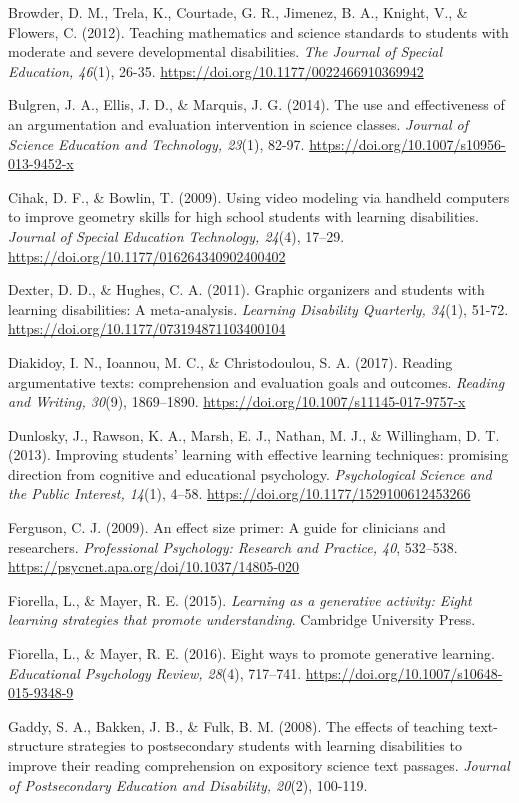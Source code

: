 \documentclass[11.5pt]{sig-alternate} %
\begin{document}
Browder, D. M., Trela, K., Courtade, G. R., Jimenez, B. A., Knight, V., \& Flowers, C. (2012). Teaching mathematics and science standards to students with moderate and severe developmental disabilities. \textit{The Journal of Special Education, 46}(1), 26-35. \url{https://doi.org/10.1177/0022466910369942}

Bulgren, J. A., Ellis, J. D., \& Marquis, J. G. (2014). The use and effectiveness of an argumentation and evaluation intervention in science classes. \textit{Journal of Science Education and Technology, 23}(1), 82-97. \url{https://doi.org/10.1007/s10956-013-9452-x}

 Cihak, D. F., \& Bowlin, T. (2009). Using video modeling via handheld computers to improve geometry skills for high school students with learning disabilities. \textit{Journal of Special Education Technology, 24}(4), 17–29. \url{https://doi.org/10.1177/016264340902400402}
 
Dexter, D. D., \& Hughes, C. A. (2011). Graphic organizers and students with learning disabilities: A meta-analysis. \textit{Learning Disability Quarterly, 34}(1), 51-72. \url{https://doi.org/10.1177/073194871103400104}

Diakidoy, I. N., Ioannou, M. C., \& Christodoulou, S. A. (2017). Reading argumentative texts: comprehension and evaluation goals and outcomes. \textit{Reading and Writing, 30}(9), 1869–1890. \url{https://doi.org/10.1007/s11145-017-9757-x}

Dunlosky, J., Rawson, K. A., Marsh, E. J., Nathan, M. J., \& Willingham, D. T. (2013). Improving students’ learning with effective learning techniques: promising direction from cognitive and educational psychology. \textit{Psychological Science and the Public Interest, 14}(1), 4–58. \url{https://doi.org/10.1177/1529100612453266}

Ferguson, C. J. (2009). An effect size primer: A guide for clinicians and researchers. \textit{Professional Psychology: Research and Practice, 40}, 532–538. \url{https://psycnet.apa.org/doi/10.1037/14805-020}

Fiorella, L., \& Mayer, R. E. (2015). \textit{Learning as a generative activity: Eight learning strategies that promote understanding}. Cambridge University Press. 

Fiorella, L., \& Mayer, R. E. (2016). Eight ways to promote generative learning. \textit{Educational Psychology Review, 28}(4), 717–741. \url{https://doi.org/10.1007/s10648-015-9348-9}

Gaddy, S. A., Bakken, J. B., \& Fulk, B. M. (2008). The effects of teaching text-structure strategies to postsecondary students with learning disabilities to improve their reading comprehension on expository science text passages. \textit{Journal of Postsecondary Education and Disability, 20}(2), 100-119.
\end{document}

